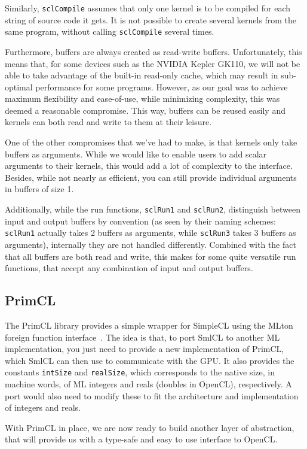 Similarly, \texttt{sclCompile} assumes that only one kernel is to be
compiled for each string of source code it gets. It is not possible to
create several kernels from the same program, without calling
\texttt{sclCompile} several times.

Furthermore, buffers are always created as read-write
buffers. Unfortunately, this means that, for some devices such as the
NVIDIA Kepler GK110, we will not be able to take advantage of the
built-in read-only cache, which may result in sub-optimal performance
for some programs. However, as our goal was to achieve maximum
flexibility and ease-of-use, while minimizing complexity, this was
deemed a reasonable compromise. This way, buffers can be reused
easily and kernels can both read and write to them at their leisure.

One of the other compromises that we've had to make, is that kernels
only take buffers as arguments. While we would like to enable users to
add scalar arguments to their kernels, this would add a lot of
complexity to the interface. Besides, while not nearly as efficient,
you can still provide individual arguments in buffers of size 1.

Additionally, while the run functions, \texttt{sclRun1} and
\texttt{sclRun2}, distinguish between input and output buffers by
convention (as seen by their naming schemes: \texttt{sclRun1} actually
takes 2 buffers as arguments, while \texttt{sclRun3} takes 3 buffers
as arguments), internally they are not handled differently. Combined
with the fact that all buffers are both read and write, this makes for
some quite versatile run functions, that accept any combination of
input and output buffers.

\subsection{PrimCL}

The PrimCL library provides a simple wrapper for SimpleCL using the
MLton foreign function interface~\cite{ffi}. The idea is that, to port
SmlCL to another ML implementation, you just need to provide a new
implementation of PrimCL, which SmlCL can then use to communicate with
the GPU. It also provides the constants \texttt{intSize} and
\texttt{realSize}, which corresponds to the native size, in machine
words, of ML integers and reals (doubles in OpenCL), respectively. A
port would also need to modify these to fit the architecture and
implementation of integers and reals.

With PrimCL in place, we are now ready to build another layer of
abstraction, that will provide us with a type-safe and easy to use
interface to OpenCL.
